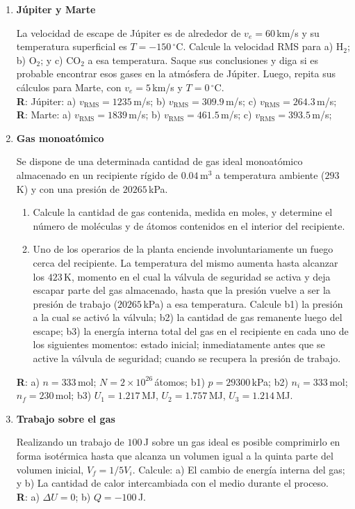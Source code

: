 \documentclass[a4paper,12pt]{article}
\begin{document}
\begin{enumerate}
	\item {\bf{Júpiter y Marte}}

		La velocidad de escape de Júpiter es de alrededor de $v_e=60$\,km/s y
		su temperatura superficial es $T=-150\,^\circ$C. Calcule la velocidad
		RMS para a) H$_2$; b) O$_2$; y c) CO$_2$ a esa temperatura. Saque sus
		conclusiones y diga si es probable encontrar esos gases en la atmósfera
		de Júpiter. Luego, repita sus cálculos para Marte, con $v_e=5$\,km/s y
		$T=0\,^\circ$C.
		\\{\bf R}: Júpiter: a) $v_{\mathrm{RMS}}=1235$\,m/s; b)
		$v_{\mathrm{RMS}}=309.9$\,m/s; c) $v_{\mathrm{RMS}}=264.3$\,m/s;
		\\{\bf R}: Marte: a) $v_{\mathrm{RMS}}=1839$\,m/s; b)
		$v_{\mathrm{RMS}}=461.5$\,m/s; c) $v_{\mathrm{RMS}}=393.5$\,m/s;
	
	\item {\bf{Gas monoatómico}}
	
		Se dispone de una determinada cantidad de gas ideal monoatómico
		almacenado en un recipiente rígido de $0.04$\,m$^3$ a temperatura
		ambiente ($293$\,K) y con una presión de $20265$\,kPa.
		\begin{enumerate}
			\item Calcule la cantidad de gas contenida, medida en moles, y
				determine el número de moléculas y de átomos contenidos en el
				interior del recipiente. 
			\item Uno de los operarios de la planta enciende involuntariamente
				un fuego cerca del recipiente. La temperatura del mismo aumenta
				hasta alcanzar los $423$\,K, momento en el cual la válvula de
				seguridad se activa y deja escapar parte del gas almacenado,
				hasta que la presión vuelve a ser la presión de trabajo
				($20265$\,kPa) a esa temperatura. Calcule b1) la presión a la
				cual se activó la válvula; b2) la cantidad de gas remanente
				luego del escape; b3) la energía interna total del gas en el
				recipiente en cada uno de los siguientes momentos: estado
				inicial; inmediatamente antes que se active la válvula de
				seguridad; cuando se recupera la presión de trabajo.
		\end{enumerate}
		{\bf R}: a) $n=333$\,mol; $N=2\times10^{26}$\,átomos; b1)
		$p=29300$\,kPa; b2) $n_i=333$\,mol; $n_f=230$\,mol; b3)
		$U_1=1.217$\,MJ, $U_2=1.757$\,MJ, $U_3=1.214$\,MJ.

	\item {\bf{Trabajo sobre el gas}}

		Realizando un trabajo de $100$\,J sobre un gas ideal es posible
		comprimirlo en forma isotérmica hasta que alcanza un volumen igual a la
		quinta parte del volumen inicial, $V_f = 1/5 V_i$. Calcule: a) El
		cambio de energía interna del gas; y b) La cantidad de calor
		intercambiada con el medio durante el proceso. 
		\\{\bf R}: a) $\Delta U = 0$; b) $Q=-100$\,J.
	

\end{enumerate}
\end{document}
